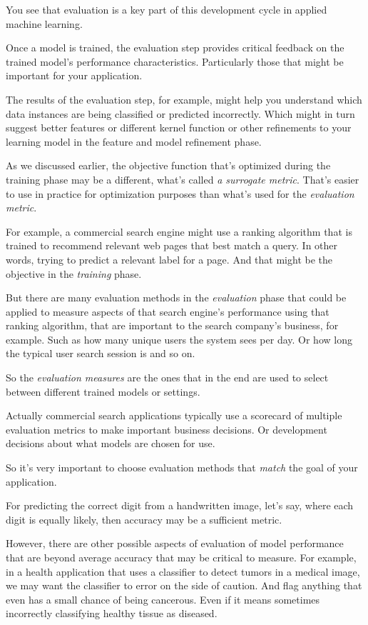 \begin{multicols}{2}
You see that evaluation is a key part of this development cycle in applied machine learning. 

Once a model is trained, the evaluation step provides critical feedback on the trained model's performance characteristics. Particularly those that might be important for your application. 

The results of the evaluation step, for example, might help you understand which data instances are being classified or predicted incorrectly. Which might in turn suggest better features or different kernel function or other refinements to your learning model in the feature and model refinement phase. 

As we discussed earlier, the objective function that's optimized during the training phase may be a different, what's called \emph{a surrogate metric}. That's easier to use in practice for optimization purposes than what's used for the \emph{evaluation metric}. 

For example, a commercial search engine might use a ranking algorithm that is trained to recommend relevant web pages that best match a query. In other words, trying to predict a relevant label for a page. And that might be the objective in the \emph{training} phase. 

But there are many evaluation methods in the \emph{evaluation} phase that could be applied to measure aspects of that search engine's performance using that ranking algorithm, that are important to the search company's business, for example. Such as how many unique users the system sees per day. Or how long the typical user search session is and so on. 

So the \emph{evaluation measures} are the ones that in the end are used to select between different trained models or settings. 

Actually commercial search applications typically use a scorecard of multiple evaluation metrics to make important business decisions. Or development decisions about what models are chosen for use. 

So it's very important to choose evaluation methods that \emph{match} the goal of your application. 

For predicting the correct digit from a handwritten image, let's say, where each digit is equally likely, then accuracy may be a sufficient metric. 

However, there are other possible aspects of evaluation of model performance that are beyond average accuracy that may be critical to measure. For example, in a health application that uses a classifier to detect tumors in a medical image, we may want the classifier to error on the side of caution. And flag anything that even has a small chance of being cancerous. Even if it means sometimes incorrectly classifying healthy tissue as diseased. 


\end{multicols}
